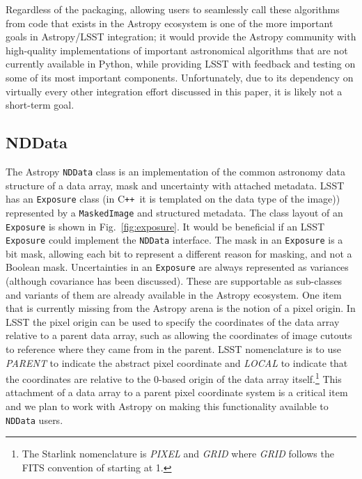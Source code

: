\documentclass[]{spie}  %
\newcommand{\CPP}{C\texttt{++}\xspace}  %
\begin{document}
Regardless of the packaging, allowing users to seamlessly call these algorithms from code that exists in the Astropy ecosystem is one of the more important goals in Astropy/LSST integration; it would provide the Astropy community with high-quality implementations of important astronomical algorithms that are not currently available in Python, while providing LSST with feedback and testing on some of its most important components.
Unfortunately, due to its dependency on virtually every other integration effort discussed in this paper, it is likely not a short-term goal.

\subsection{NDData}

The Astropy \texttt{NDData} class is an implementation of the common astronomy data structure\cite{2015A&C....12..146J} of a data array, mask and uncertainty with attached metadata.
LSST has an \texttt{Exposure} class (in \CPP\ it is templated on the data type of the image)) represented by a \texttt{MaskedImage} and structured metadata.
The class layout of an \texttt{Exposure} is shown in Fig.~\ref{fig:exposure}.
It would be beneficial if an LSST \texttt{Exposure} could implement the \texttt{NDData} interface.
The mask in an \texttt{Exposure} is a bit mask, allowing each bit to represent a different reason for masking, and not a Boolean mask.
Uncertainties in an \texttt{Exposure} are always represented as variances (although covariance has been discussed).
These are supportable as sub-classes and variants of them are already available in the Astropy ecosystem.
One item that is currently missing from the Astropy arena is the notion of a pixel origin.
In LSST the pixel origin can be used to specify the coordinates of the data array relative to a parent data array, such as allowing the coordinates of image cutouts to reference where they came from in the parent.
LSST nomenclature is to use \emph{PARENT} to indicate the abstract pixel coordinate and \emph{LOCAL} to indicate that the coordinates are relative to the 0-based origin of the data array itself.\footnote{The Starlink nomenclature\cite{2015A&C....12..146J} is \emph{PIXEL} and \emph{GRID} where \emph{GRID} follows the FITS convention of starting at 1.}
This attachment of a data array to a parent pixel coordinate system is a critical item and we plan to work with Astropy on making this functionality available to \texttt{NDData} users.
\end{document}
